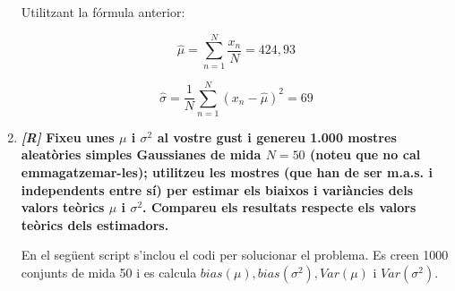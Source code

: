 \documentclass[a4paper]{article}
\begin{document}
\begin{enumerate}
Utilitzant la fórmula anterior: 

$$ \hat{\mu} = \sum_{n=1}^N \frac{x_n}{N} = 424,93 $$

$$ \hat{\sigma} = \frac{1}{N} \sum_{n=1}^N (x_n - \hat{\mu})^2 = 69 $$

\item \textbf{\emph{[R]} Fixeu unes $ \mu $ i $ \sigma^2 $ al vostre gust i genereu 1.000 mostres aleatòries simples Gaussianes de mida $ N = 50 $ (noteu que no cal emmagatzemar-les); utilitzeu les mostres (que han de ser m.a.s. i independents entre sí) per estimar els biaixos i variàncies dels valors teòrics $ \mu $ i $ \sigma^2 $. Compareu els resultats respecte els valors teòrics dels estimadors.}

En el següent script s'inclou el codi per solucionar el problema. Es creen 1000 conjunts de mida 50 i es calcula $ bias(\mu), bias(\sigma^2), Var(\mu)\text{ i } Var(\sigma^2)$.

\vspace{0.5cm}



\end{enumerate}
\end{document}
